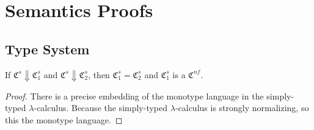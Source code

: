 
\chapter{Semantics Proofs}\label{ch:proofs}

\section{Type System}

\begin{lemma}\label{lem:tycred}
If $\mathfrak{C}^s \Downarrow \mathfrak{C}^s_1$ and $\mathfrak{C}^s \Downarrow \mathfrak{C}^s_2$, then $\mathfrak{C}^s_1 = \mathfrak{C}^s_2$ and $\mathfrak{C}^s_1$ is a $\mathfrak{C}^{nf}$. 
\end{lemma}
\begin{proof}
There is a precise embedding of the monotype language in the simply-typed $\lambda$-calculus. Because the simply-typed $\lambda$-calculus is strongly normalizing, so this the monotype language. 
\end{proof}


